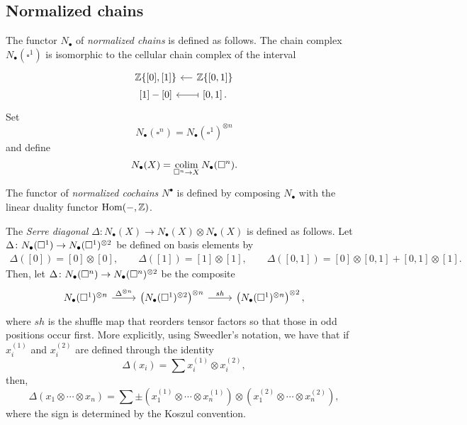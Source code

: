 \subsection{Normalized chains}
The functor $N_\bullet$ of \textit{normalized chains} is defined as follows. The chain complex $N_\bullet(\square^1)$ is isomorphic to the cellular chain complex of the interval
\begin{equation*}
\begin{tikzcd} [column sep = small, row sep = 0.1pt]
\Z\{[0], [1]\}  & \arrow[l] \Z\{[0,1]\} \\
{[1] - [0]} & \arrow[l, |->] \left[0,1\right].
\end{tikzcd}
\end{equation*}
Set
\begin{equation} \label{eq: chains on I^n}
N_\bullet(\square^n) = N_\bullet(\square^1)^{\otimes n}
\end{equation}
and define
\begin{equation*}
N_\bullet(X) = \operatorname*{colim}_{\square^n \to X} N_\bullet(\square^n).
\end{equation*}

The functor of \textit{normalized cochains} $N^\bullet$ is defined by composing $N_\bullet$ with the linear duality functor $\mathrm{Hom}(-, \mathbb{Z})$.

The \textit{Serre diagonal} $\Delta \colon N_\bullet(X) \to N_\bullet(X) \otimes N_\bullet(X)$ is defined as follows. Let $\Delta \colon N_\bullet(\square^1) \to N_\bullet(\square^1)^{\otimes 2}$ be defined on basis elements by	
\begin{gather*}	
\Delta([0]) = [0] \otimes [0], \qquad 
\Delta([1]) = [1] \otimes [1], \qquad
\Delta([0, 1]) = [0] \otimes [0, 1] + [0, 1] \otimes [1].	
\end{gather*}	
Then, let
$\Delta \colon N_\bullet(\square^n) \to N_\bullet(\square^n)^{\otimes 2}$
be the composite
\begin{equation*}
\begin{tikzcd}
\chains(\square^1)^{\otimes n} \arrow[r, "\Delta^{\otimes n}"] & \left( \chains(\square^1)^{\otimes 2} \right)^{\otimes n} \arrow[r, "sh"] & \left( \chains(\square^1)^{\otimes n} \right)^{\otimes 2},
\end{tikzcd}
\end{equation*}
where $sh$ is the shuffle map that reorders tensor factors so that those in odd positions occur first. More explicitly, using Sweedler's notation, we have that if $x_i^{(1)}$ and $x_i^{(2)}$ are defined through the identity
\begin{equation*}	
\Delta(x_i) = \sum x_i^{(1)} \otimes x_i^{(2)},
\end{equation*}	
then,
\begin{equation} \label{E: Delta}	
\Delta (x_1 \otimes \cdots \otimes x_n) = 	
\sum \pm \left( x_1^{(1)} \otimes \cdots \otimes x_n^{(1)} \right) \otimes 	
\left( x_1^{(2)} \otimes \cdots \otimes x_n^{(2)} \right),
\end{equation}	
where the sign is determined by the Koszul convention.


